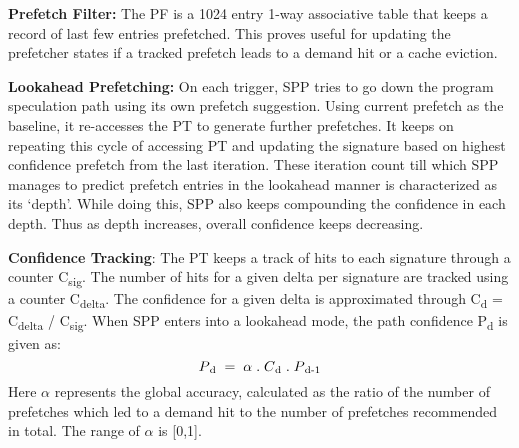 

\textbf{Prefetch Filter:} The PF is a 1024 entry 1-way associative table that
keeps a record of last few entries prefetched.  This proves useful for
updating the prefetcher states if a tracked prefetch leads to a demand hit or
a cache eviction.

\textbf{Lookahead Prefetching:} On each trigger, SPP tries to go down
the program speculation path using its own prefetch suggestion.
Using current prefetch as the baseline, it re-accesses the PT to generate further
prefetches.  It keeps on repeating this cycle of accessing PT and
updating the signature based on highest confidence prefetch from the
last iteration.  These iteration count till which SPP manages to
predict prefetch entries in the lookahead manner is characterized as
its `depth'.  While doing this, SPP also keeps compounding the
confidence in each depth.  Thus as depth increases, overall confidence
keeps decreasing.  

\textbf{Confidence Tracking}: The PT keeps a track of hits to each
signature through a counter C\textsubscript{sig}.  The number of hits
for a given delta per signature are tracked using a counter
C\textsubscript{delta}.  The confidence for a given delta is
approximated through C\textsubscript{d} = C\textsubscript{delta} /
C\textsubscript{sig}.  When SPP enters into a lookahead mode, the path
confidence P\textsubscript{d} is given as:
$$P\textsubscript{d} \;=\; \alpha  \;.\;  C\textsubscript{d}  \;.\;  P\textsubscript{d-1}$$ 
Here $\alpha$ represents the global accuracy, calculated as the ratio of 
the number of prefetches which led to a demand hit to the number of 
prefetches recommended in total. The range of $\alpha$ is [0,1].

